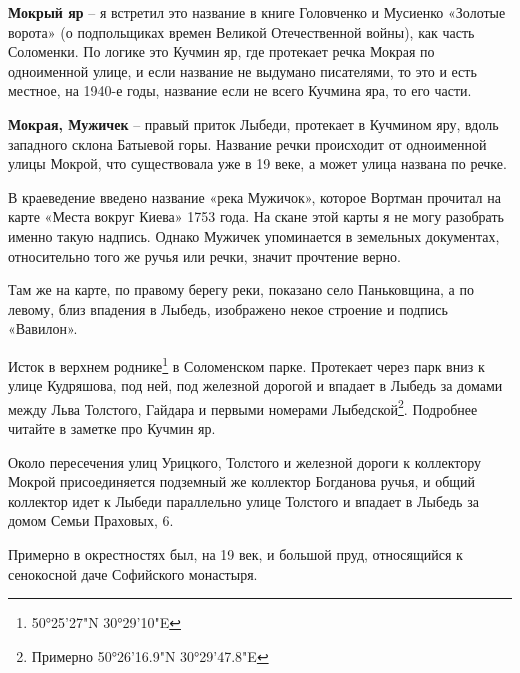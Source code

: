 \textbf{Мокрый яр} – я встретил это название в книге Головченко и Мусиенко «Золотые ворота» (о подпольщиках времен Великой Отечественной войны), как часть Соломенки. По логике это Кучмин яр, где протекает речка Мокрая по одноименной улице, и если название не выдумано писателями, то это и есть местное, на 1940-е годы, название если не всего Кучмина яра, то его части.\\

\medskip

\textbf{Мокрая, Мужичек} – правый приток Лыбеди, протекает в Кучмином яру, вдоль западного склона Батыевой горы. Название речки происходит от одноименной улицы Мокрой, что существовала уже в 19 веке, а может улица названа по речке.

В краеведение введено название «река Мужичок», которое Вортман прочитал на карте «Места вокруг Киева» 1753 года. На скане этой карты я не могу разобрать именно такую надпись. Однако Мужичек упоминается в земельных документах, относительно того же ручья или речки, значит прочтение верно.

Там же на карте, по правому берегу реки, показано село Паньковщина, а по левому, близ впадения в Лыбедь, изображено некое строение и подпись «Вавилон».

Исток в верхнем роднике\footnote{50°25'27"N   30°29'10"E} в Соломенском парке. Протекает через парк вниз к улице Кудряшова, под ней, под железной дорогой и впадает в Лыбедь за домами между Льва Толстого, Гайдара и первыми номерами Лыбедской\footnote{Примерно 50°26'16.9"N 30°29'47.8"E}. Подробнее читайте в заметке про Кучмин яр.

Около пересечения улиц Урицкого, Толстого и железной дороги к коллектору Мокрой присоединяется подземный же коллектор Богданова ручья, и общий коллектор идет к Лыбеди параллельно улице Толстого и впадает в Лыбедь за домом Семьи Праховых, 6.




Примерно в окрестностях был, на 19 век, и большой пруд, относящийся к сенокосной даче Софийского монастыря.\\

\medskip





